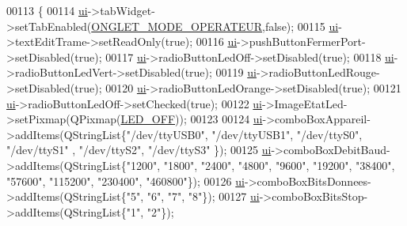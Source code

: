 \begin{DoxyCode}
00113 \{
00114     \hyperlink{class_ihm_a0ac5f47856566ceeeca1720109bf70ea}{ui}->tabWidget->setTabEnabled(\hyperlink{ihm_8h_a467f42462a8692cc6e1027a51c725759}{ONGLET\_MODE\_OPERATEUR},\textcolor{keyword}{false});
00115     \hyperlink{class_ihm_a0ac5f47856566ceeeca1720109bf70ea}{ui}->textEditTrame->setReadOnly(\textcolor{keyword}{true});
00116     \hyperlink{class_ihm_a0ac5f47856566ceeeca1720109bf70ea}{ui}->pushButtonFermerPort->setDisabled(\textcolor{keyword}{true});
00117     \hyperlink{class_ihm_a0ac5f47856566ceeeca1720109bf70ea}{ui}->radioButtonLedOff->setDisabled(\textcolor{keyword}{true});
00118     \hyperlink{class_ihm_a0ac5f47856566ceeeca1720109bf70ea}{ui}->radioButtonLedVert->setDisabled(\textcolor{keyword}{true});
00119     \hyperlink{class_ihm_a0ac5f47856566ceeeca1720109bf70ea}{ui}->radioButtonLedRouge->setDisabled(\textcolor{keyword}{true});
00120     \hyperlink{class_ihm_a0ac5f47856566ceeeca1720109bf70ea}{ui}->radioButtonLedOrange->setDisabled(\textcolor{keyword}{true});
00121     \hyperlink{class_ihm_a0ac5f47856566ceeeca1720109bf70ea}{ui}->radioButtonLedOff->setChecked(\textcolor{keyword}{true});
00122     \hyperlink{class_ihm_a0ac5f47856566ceeeca1720109bf70ea}{ui}->ImageEtatLed->setPixmap(QPixmap(\hyperlink{ihm_8h_a80700bb63bd56ebabbb4728aa433fd29}{LED\_OFF}));
00123 
00124     \hyperlink{class_ihm_a0ac5f47856566ceeeca1720109bf70ea}{ui}->comboBoxAppareil->addItems(QStringList\{\textcolor{stringliteral}{"/dev/ttyUSB0"}, \textcolor{stringliteral}{"/dev/ttyUSB1"}, \textcolor{stringliteral}{"/dev/ttyS0"}, \textcolor{stringliteral}{"/dev/ttyS1"}
      , \textcolor{stringliteral}{"/dev/ttyS2"}, \textcolor{stringliteral}{"/dev/ttyS3"} \});
00125     \hyperlink{class_ihm_a0ac5f47856566ceeeca1720109bf70ea}{ui}->comboBoxDebitBaud->addItems(QStringList\{\textcolor{stringliteral}{"1200"}, \textcolor{stringliteral}{"1800"}, \textcolor{stringliteral}{"2400"}, \textcolor{stringliteral}{"4800"}, \textcolor{stringliteral}{"9600"}, \textcolor{stringliteral}{"19200"}, \textcolor{stringliteral}{"38400"},
       \textcolor{stringliteral}{"57600"}, \textcolor{stringliteral}{"115200"}, \textcolor{stringliteral}{"230400"}, \textcolor{stringliteral}{"460800"}\});
00126     \hyperlink{class_ihm_a0ac5f47856566ceeeca1720109bf70ea}{ui}->comboBoxBitsDonnees->addItems(QStringList\{\textcolor{stringliteral}{"5"}, \textcolor{stringliteral}{"6"}, \textcolor{stringliteral}{"7"}, \textcolor{stringliteral}{"8"}\});
00127     \hyperlink{class_ihm_a0ac5f47856566ceeeca1720109bf70ea}{ui}->comboBoxBitsStop->addItems(QStringList\{\textcolor{stringliteral}{"1"}, \textcolor{stringliteral}{"2"}\});

\end{DoxyCode}
